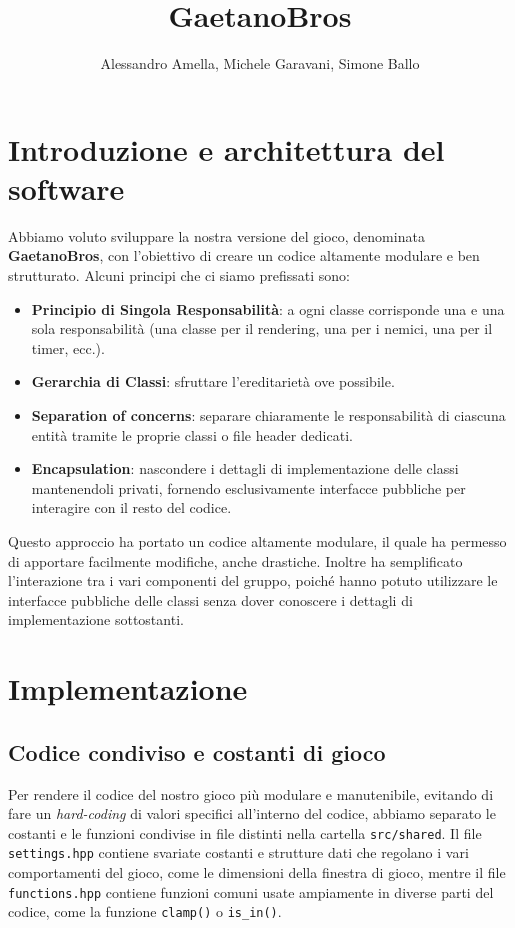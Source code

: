 \documentclass[a4paper,12pt]{article}
\title{\textbf{GaetanoBros}}
\author{Alessandro Amella, Michele Garavani, Simone Ballo}
\date{\formatdate{2}{9}{2023}}
\begin{document}
\maketitle

\section{Introduzione e architettura del software}
Abbiamo voluto sviluppare la nostra versione del gioco, denominata \textbf{GaetanoBros}, con l'obiettivo di creare un codice altamente modulare e ben strutturato. Alcuni principi che ci siamo prefissati sono:
\begin{itemize}
\item \textbf{Principio di Singola Responsabilità}: a ogni classe corrisponde una e una sola responsabilità (una classe per il rendering, una per i nemici, una per il timer, ecc.).
\item \textbf{Gerarchia di Classi}: sfruttare l'ereditarietà ove possibile.
\item \textbf{Separation of concerns}: separare chiaramente le responsabilità di ciascuna entità tramite le proprie classi o file header dedicati.
\item \textbf{Encapsulation}: nascondere i dettagli di implementazione delle classi mantenendoli privati, fornendo esclusivamente interfacce pubbliche per interagire con il resto del codice.
\end{itemize}

Questo approccio ha portato un codice altamente modulare, il quale ha permesso di apportare facilmente modifiche, anche drastiche. Inoltre ha semplificato l'interazione tra i vari componenti del gruppo, poiché hanno potuto utilizzare le interfacce pubbliche delle classi senza dover conoscere i dettagli di implementazione sottostanti.


\section{Implementazione}
\subsection{Codice condiviso e costanti di gioco}
Per rendere il codice del nostro gioco più modulare e manutenibile, evitando di fare un \textit{hard-coding} di valori specifici all'interno del codice, abbiamo separato le costanti e le funzioni condivise in file distinti nella cartella \texttt{src/shared}. Il file \texttt{settings.hpp} contiene svariate costanti e strutture dati che regolano i vari comportamenti del gioco, come le dimensioni della finestra di gioco, mentre il file \texttt{functions.hpp} contiene funzioni comuni usate ampiamente in diverse parti del codice, come la funzione \texttt{clamp()} o \texttt{is\_in()}.
\end{document}
